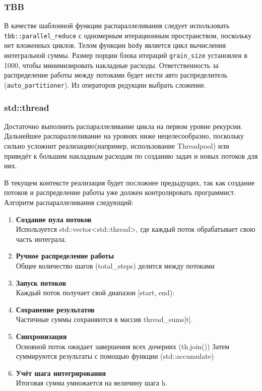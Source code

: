 \documentclass[14pt,a4paper]{article}
\begin{document}
\subsubsection{TBB}
В качестве шаблонной функции распараллеливания следует использовать \texttt{tbb::parallel\_reduce} 
с одномерным итерационным пространством, поскольку нет вложенных циклов. Телом функции
\texttt{body} является цикл вычисления интегральной суммы.
Размер порции блока итераций \texttt{grain\_size}  установлен в 1000, чтобы минимизировать накладные расходы. 
Ответственность за распределение работы между потоками будет нести авто распределитель
(\texttt{auto\_partitioner}). Из операторов редукции выбрать сложение. 

\subsubsection{std::thread}
Достаточно выполнить распараллеливание цикла на первом уровне рекурсии.
Дальнейшее распараллеливание на уровнях ниже нецелесообразно, поскольку 
сильно усложнит реализацию(например, использование Threadpool) или приведёт 
к большим накладным расходам по созданию задач и новых потоков для них.

В текущем контексте реализация будет посложнее предыдущих, так как создание потоков
и распределение работы уже должен контролировать программист. Алгоритм 
распараллеливания следующий:

\begin{enumerate}
\item \textbf{Создание пула потоков} \\
Используется std::vector<std::thread>, где каждый поток обрабатывает свою часть интеграла.

\item \textbf{Ручное распределение работы} \\
Общее количество шагов (total\_steps) делится между потоками

\item \textbf{Запуск потоков} \\
Каждый поток получает свой диапазон [start, end):

\item \textbf{Сохранение результатов} \\
Частичные суммы сохраняются в массив thread\_sums[t].

\item \textbf{Синхронизация} \\
Основной поток ожидает завершения всех дочерних (th.join())
Затем суммируются результаты с помощью функции (std::accumulate)

\item \textbf{Учёт шага интегрирования} \\
Итоговая сумма умножается на величину шага h.
\end{enumerate}
\end{document}
